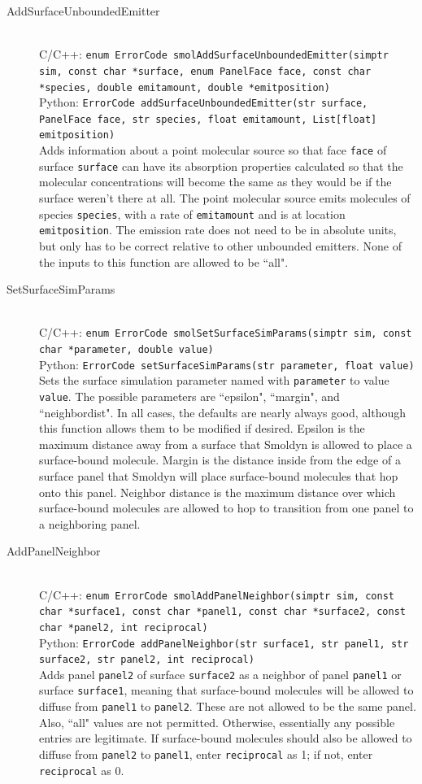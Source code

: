 \documentclass {book}
\newcommand {\ttt} {\texttt}
\begin{document}
\begin{description}
\item[AddSurfaceUnboundedEmitter]
\hfill \\
C/C++: \ttt{enum ErrorCode smolAddSurfaceUnboundedEmitter(simptr sim, const char *surface, enum PanelFace face, const char *species, double emitamount, double *emitposition)}\\
Python: \ttt{ErrorCode addSurfaceUnboundedEmitter(str surface, PanelFace face, str species, float emitamount, List[float] emitposition)}\\
Adds information about a point molecular source so that face \ttt{face} of surface \ttt{surface} can have its absorption properties calculated so that the molecular concentrations will become the same as they would be if the surface weren't there at all. The point molecular source emits molecules of species \ttt{species}, with a rate of \ttt{emitamount} and is at location \ttt{emitposition}. The emission rate does not need to be in absolute units, but only has to be correct relative to other unbounded emitters. None of the inputs to this function are allowed to be ``all".

\item[SetSurfaceSimParams]
\hfill \\
C/C++: \ttt{enum ErrorCode smolSetSurfaceSimParams(simptr sim, const char *parameter, double value)}\\
Python: \ttt{ErrorCode setSurfaceSimParams(str parameter, float value)}\\
Sets the surface simulation parameter named with \ttt{parameter} to value \ttt{value}. The possible parameters are ``epsilon", ``margin", and ``neighbordist". In all cases, the defaults are nearly always good, although this function allows them to be modified if desired. Epsilon is the maximum distance away from a surface that Smoldyn is allowed to place a surface-bound molecule. Margin is the distance inside from the edge of a surface panel that Smoldyn will place surface-bound molecules that hop onto this panel. Neighbor distance is the maximum distance over which surface-bound molecules are allowed to hop to transition from one panel to a neighboring panel.

\item[AddPanelNeighbor]
\hfill \\
C/C++: \ttt{enum ErrorCode smolAddPanelNeighbor(simptr sim, const char *surface1, const char *panel1, const char *surface2, const char *panel2, int reciprocal)}\\
Python: \ttt{ErrorCode addPanelNeighbor(str surface1, str panel1, str surface2, str panel2, int reciprocal)}\\
Adds panel \ttt{panel2} of surface \ttt{surface2} as a neighbor of panel \ttt{panel1} or surface \ttt{surface1}, meaning that surface-bound molecules will be allowed to diffuse from \ttt{panel1} to \ttt{panel2}. These are not allowed to be the same panel. Also, ``all" values are not permitted. Otherwise, essentially any possible entries are legitimate. If surface-bound molecules should also be allowed to diffuse from \ttt{panel2} to \ttt{panel1}, enter \ttt{reciprocal} as 1; if not, enter \ttt{reciprocal} as 0.


\end{description}
\end{document}

